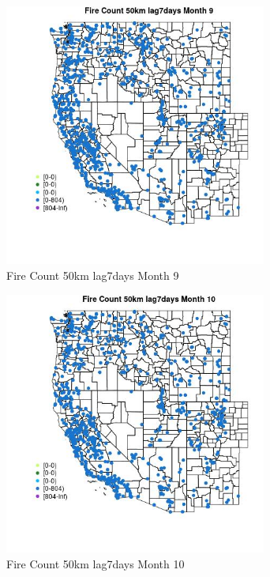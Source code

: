 \begin{figure} 
\centering  
\includegraphics[width=0.77\textwidth]{Code_Outputs/Report_ML_input_PM25_Step4_part_f_de_duplicated_aves_prioritize_24hr_obswNAs_MapObsMo9Fire_Count_50km_lag7days.jpg} 
\caption{\label{fig:Report_ML_input_PM25_Step4_part_f_de_duplicated_aves_prioritize_24hr_obswNAsMapObsMo9Fire_Count_50km_lag7days}Fire Count 50km lag7days Month 9} 
\end{figure} 
 

\clearpage 

\begin{figure} 
\centering  
\includegraphics[width=0.77\textwidth]{Code_Outputs/Report_ML_input_PM25_Step4_part_f_de_duplicated_aves_prioritize_24hr_obswNAs_MapObsMo10Fire_Count_50km_lag7days.jpg} 
\caption{\label{fig:Report_ML_input_PM25_Step4_part_f_de_duplicated_aves_prioritize_24hr_obswNAsMapObsMo10Fire_Count_50km_lag7days}Fire Count 50km lag7days Month 10} 
\end{figure} 
 

